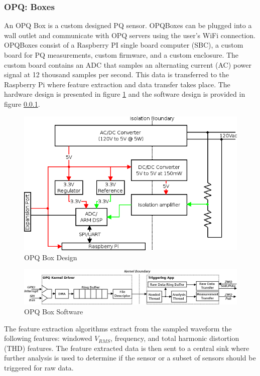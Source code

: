 \subsubsection{OPQ: Boxes}
An OPQ Box is a custom designed PQ sensor. OPQBoxes can be plugged into a wall outlet and communicate with OPQ servers using the user's WiFi connection. OPQBoxes consist of a Raspberry PI single board computer (SBC), a custom board for PQ measurements, custom firmware, and a custom enclosure. The custom board contains an ADC that samples an alternating current (AC) power signal at 12 thousand samples per second. This data is transferred to the Raspberry Pi where feature extraction and data transfer takes place. The hardware design is presented in figure \ref{fig:opq-box-design} and the software design is provided in figure \ref{}.

\begin{figure}
	\centering
	\includegraphics[width=.75\linewidth]{figures/opqbox_diagram.png}
	\caption{OPQ Box Design}\label{fig:opq-box-design}
\end{figure}

\begin{figure}
	\centering
	\includegraphics[width=.75\linewidth]{figures/opqbox_software.png}
	\caption{OPQ Box Software}\label{fig:opq-box-software}
\end{figure}

The feature extraction algorithms extract from the sampled waveform the following features: windowed $V_{RMS}$, frequency, and total harmonic distortion (THD) features. The feature extracted data is then sent to a central sink where further analysis is used to determine if the sensor or a subset of sensors should be triggered for raw data.

